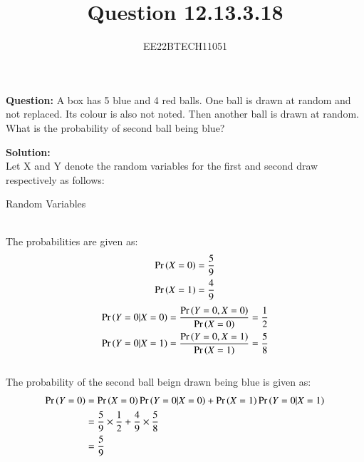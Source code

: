 \documentclass[journal,12pt,onecolumn]{IEEEtran}
\theoremstyle{remark}
\begin{document}

\vspace{3cm}


\title{Question 12.13.3.18}
\author{EE22BTECH11051}

\maketitle
\vspace{3cm}

\textbf{Question:} A box has 5 blue and 4 red balls. One ball is drawn at random and not replaced.
Its colour is also not noted. Then another ball is drawn at random. What is the
probability of second ball being blue?

\textbf{Solution:} \\
Let X and Y denote the random variables for the first and second draw respectively as follows:
\begin{table}[h]
    \centering
    
    \caption{Random Variables}
    \label{12.13.3.8_table_1}
    \end{table}
\\
The probabilities are given as:
\begin{align}
    \Pr\left(X = 0\right) = \frac{5}{9}\\
    \Pr\left(X = 1\right) = \frac{4}{9}
\end{align}
\begin{align}
    \Pr\left(Y = 0 | X = 0\right) = \frac{\Pr\left(Y = 0,X = 0\right)}{\Pr\left(X = 0\right)} = \frac{1}{2}\\
    \Pr\left(Y = 0 | X = 1\right) = \frac{\Pr\left(Y = 0,X = 1\right)}{\Pr\left(X = 1\right)} = \frac{5}{8}
\end{align}
    \\
The probability of the second ball beign drawn being blue is given as:
\begin{align}
\Pr\left(Y = 0\right) &= \Pr\left(X = 0\right)\Pr\left(Y = 0 | X = 0\right) + \Pr\left(X = 1\right)\Pr\left(Y = 0 | X = 1\right)\\
           &= {\frac{5}{9}}\times{\frac{1}{2}} + {\frac{4}{9}}\times{{\frac{5}{8}}}\\
           &= \frac{5}{9}
\end{align}
\end{document}
